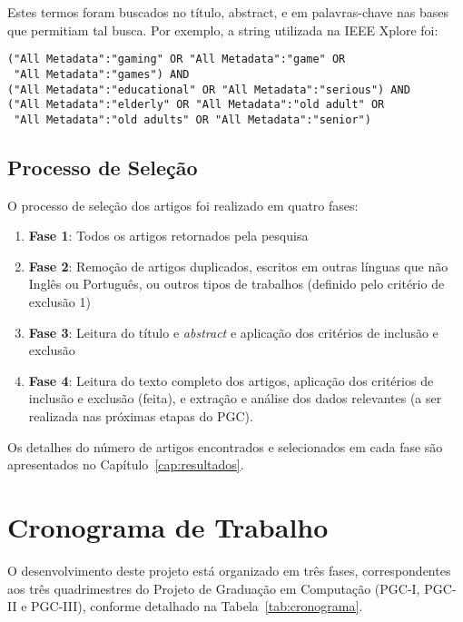 Estes termos foram buscados no título, abstract, e em palavras-chave nas bases que permitiam tal busca. Por exemplo, a string utilizada na IEEE Xplore foi:
\begin{verbatim}
("All Metadata":"gaming" OR "All Metadata":"game" OR 
 "All Metadata":"games") AND 
("All Metadata":"educational" OR "All Metadata":"serious") AND 
("All Metadata":"elderly" OR "All Metadata":"old adult" OR 
 "All Metadata":"old adults" OR "All Metadata":"senior")
\end{verbatim}

\subsection{Processo de Seleção}\label{subsec:processo_selecao}

O processo de seleção dos artigos foi realizado em quatro fases:
\begin{enumerate}
    \item \textbf{Fase 1}: Todos os artigos retornados pela pesquisa
    \item \textbf{Fase 2}: Remoção de artigos duplicados, escritos em outras línguas que não Inglês ou Português, ou outros tipos de trabalhos (definido pelo critério de exclusão 1)
    \item \textbf{Fase 3}: Leitura do título e \textit{abstract} e aplicação dos critérios de inclusão e exclusão
    \item \textbf{Fase 4}: Leitura do texto completo dos artigos, aplicação dos critérios de inclusão e exclusão (feita), e extração e análise dos dados relevantes (a ser realizada nas próximas etapas do PGC).
\end{enumerate}

Os detalhes do número de artigos encontrados e selecionados em cada fase são apresentados no Capítulo~\ref{cap:resultados}.

\section{Cronograma de Trabalho}\label{sec:cronograma}

O desenvolvimento deste projeto está organizado em três fases, correspondentes aos três quadrimestres do Projeto de Graduação em Computação (PGC-I, PGC-II e PGC-III), conforme detalhado na Tabela~\ref{tab:cronograma}.

